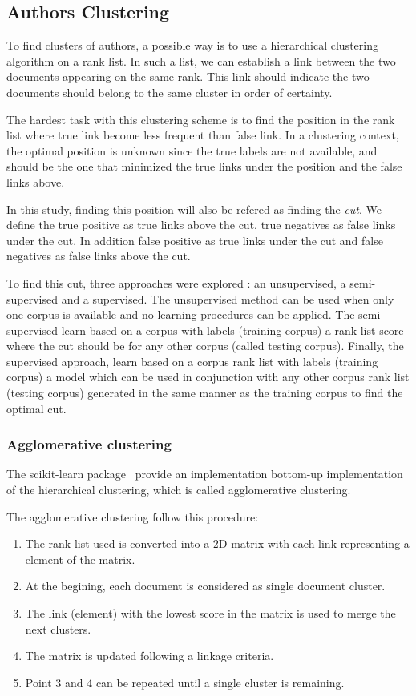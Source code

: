\subsection{Authors Clustering \label{sec:authors_clustering}}

To find clusters of authors, a possible way is to use a hierarchical clustering algorithm on a rank list.
In such a list, we can establish a link between the two documents appearing on the same rank.
This link should indicate the two documents should belong to the same cluster in order of certainty.

The hardest task with this clustering scheme is to find the position in the rank list where true link become less frequent than false link.
In a clustering context, the optimal position is unknown since the true labels are not available, and should be the one that minimized the true links under the position and the false links above.

In this study, finding this position will also be refered as finding the \textit{cut}.
We define the true positive as true links above the cut, true negatives as false links under the cut.
In addition false positive as true links under the cut and false negatives as false links above the cut.

To find this cut, three approaches were explored : an unsupervised, a semi-supervised and a supervised.
The unsupervised method can be used when only one corpus is available and no learning procedures can be applied.
The semi-supervised learn based on a corpus with labels (training corpus) a rank list score where the cut should be for any other corpus (called testing corpus).
Finally, the supervised approach, learn based on a corpus rank list with labels (training corpus) a model which can be used in conjunction with any other corpus rank list (testing corpus) generated in the same manner as the training corpus to find the optimal cut.

\subsubsection{Agglomerative clustering}

The scikit-learn package~\cite{sklearn} provide an implementation bottom-up implementation of the hierarchical clustering, which is called agglomerative clustering.

The agglomerative clustering follow this procedure:
\begin{enumerate}
  \item The rank list used is converted into a 2D matrix with each link representing a element of the matrix.
  \item At the begining, each document is considered as single document cluster.
  \item The link (element) with the lowest score in the matrix is used to merge the next clusters.
  \item The matrix is updated following a linkage criteria.
  \item Point 3 and 4 can be repeated until a single cluster is remaining.
\end{enumerate}

